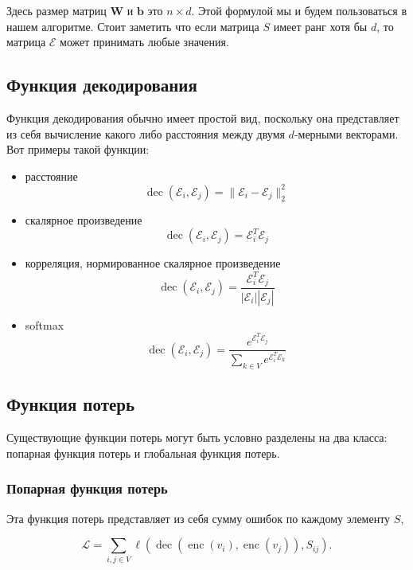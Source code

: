\documentclass[12pt,a4paper]{extarticle}
\newcommand{\E}{\mathcal{E}}
\newcommand{\W}{\textbf{W}}
\newcommand{\Loss}{\mathcal{L}}
\newcommand{\encoder}{\operatorname{enc}}
\newcommand{\decoder}{\operatorname{dec}}
\begin{document}
    Здесь размер матриц $\W$ и $\textbf{b}$ это $n \times d$. Этой формулой мы и будем пользоваться в нашем алгоритме.
    Стоит заметить что если матрица $S$ имеет ранг хотя бы $d$, то матрица $\E$ может принимать любые значения.

    \subsection{Функция декодирования}
    Функция декодирования обычно имеет простой вид, поскольку она представляет из себя вычисление какого либо расстояния между двумя $d$-мерными векторами. Вот примеры такой функции:
    \begin{itemize}
        \item расстояние
            \begin{equation} \label{dec_dist}
            \decoder(\E_i, \E_j) = \lVert \E_i - \E_j \rVert_2 ^ 2
            \end{equation}
        \item скалярное произведение
            \begin{equation} \label{dec_scal}
            \decoder(\E_i, \E_j) = \E_i^T\E_j
            \end{equation}
        \item корреляция, нормированное скалярное произведение
            \begin{equation} \label{corr}
            \decoder(\E_i, \E_j) =  \frac{\E_i^T\E_j}{|\E_i||\E_j|}
            \end{equation}
        \item softmax
            \[\decoder(\E_i, \E_j) = \frac{e^{\E_i^T\E_j}}{\sum_{k \in V} e^{\E_i^T\E_k}}\]
    \end{itemize}
    
    \subsection{Функция потерь}
    Существующие функции потерь могут быть условно разделены на два класса: попарная функция потерь и глобальная функция потерь.
    
    \subsubsection{Попарная функция потерь}
    Эта функция потерь представляет из себя сумму ошибок по каждому элементу $S$,
    
    \begin{equation} \label{pair_loss}
        \Loss = \sum_{i, j \in V} \ell (\decoder(\encoder(v_i), \encoder(v_j)), S_{ij}).
    \end{equation}
    
\end{document}

